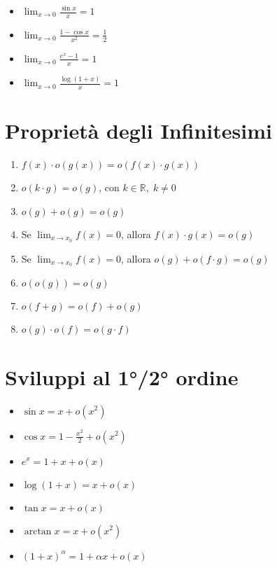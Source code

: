 \documentclass{article}
\begin{document}
\begin{multicols}{2}
    \begin{itemize}
        \item $\displaystyle \lim_{x \to 0} \frac{\sin x}{x} = 1$
        \item $\displaystyle \lim_{x \to 0} \frac{1 - \cos x}{x^2} = \frac{1}{2}$
        \item $\displaystyle \lim_{x \to 0} \frac{e^x - 1}{x} = 1$
        \item $\displaystyle \lim_{x \to 0} \frac{\log(1 + x)}{x} = 1$
    \end{itemize}
\end{multicols}

\section{Proprietà degli Infinitesimi}

\begin{enumerate}
    \item $f(x) \cdot o(g(x)) = o(f(x) \cdot g(x))$
    \item $o(k \cdot g) = o(g)$, con $k \in \mathbb{R}, \; k \neq 0$
    \item $o(g) + o(g) = o(g)$
    \item Se $\displaystyle \lim_{x \to x_0} f(x) = 0$, allora $f(x) \cdot g(x) = o(g)$
    \item Se $\displaystyle \lim_{x \to x_0} f(x) = 0$, allora $o(g) + o(f \cdot g) = o(g)$
    \item $o(o(g)) = o(g)$
    \item $o(f + g) = o(f) + o(g)$
    \item $o(g) \cdot o(f) = o(g \cdot f)$
\end{enumerate}

\section{Sviluppi al 1°/2° ordine}

\begin{multicols}{2}
    \begin{itemize}
        \item $\sin x = x + o(x^2)$
        \item $\cos x = 1 - \frac{x^2}{2} + o(x^2)$
        \item $e^x = 1 + x + o(x)$
        \item $\log(1 + x) = x + o(x)$
        \item $\tan x = x + o(x)$
        \item $\arctan x = x + o(x^2)$
        \item $(1 + x)^\alpha = 1 + \alpha x + o(x)$
    \end{itemize}
\end{multicols}
\end{document}
